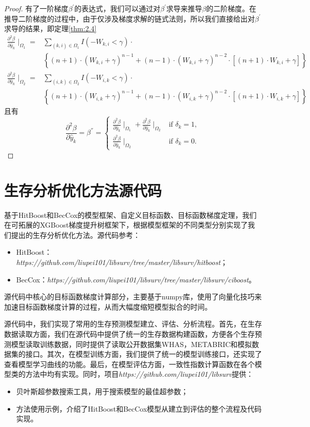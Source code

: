 \begin{proof}
有了一阶梯度$\beta^{'}$的表达式，我们可以通过对$\beta^{'}$求导来推导$\beta$的二阶梯度。在推导二阶梯度的过程中，由于仅涉及梯度求解的链式法则，所以我们直接给出对$\beta^{'}$求导的结果，即定理\ref{thm:2.4}\[
\begin{split}
\frac{\partial^2 \beta}{\partial \hat{y}_k} \mid_{\Omega_1} =& \sum\limits_{(k,i)\in \Omega_1} I(-W_{k,i}<\gamma)\cdot \\
  & \left\{(n+1)\cdot (W_{k,i}+\gamma)^{n-1} + (n-1)\cdot (W_{k,i}+\gamma)^{n-2}\cdot [(n+1)\cdot W_{k,i}+\gamma]\right\} \\
\frac{\partial^2 \beta}{\partial \hat{y}_k} \mid_{\Omega_2} =& \sum\limits_{(i,k)\in \Omega_2} I(-W_{i,k}<\gamma)\cdot \\
  & \left\{(n+1)\cdot (W_{i,k}+\gamma)^{n-1} + (n-1)\cdot (W_{i,k}+\gamma)^{n-2}\cdot [(n+1)\cdot W_{i,k}+\gamma]\right\}
\end{split}
\] 且有$$
\frac{\partial^2 \beta}{\partial \hat{y}_k}=\beta^{''}=
\begin{cases}
\frac{\partial^2 \beta}{\partial \hat{y}_k} \mid_{\Omega_1} + \frac{\partial^2 \beta}{\partial \hat{y}_k} \mid_{\Omega_2} & \text{if } \delta_k = 1,\\
\frac{\partial^2 \beta}{\partial \hat{y}_k} \mid_{\Omega_2} & \text{if } \delta_k = 0.
\end{cases}
$$
\end{proof}

\chapter{生存分析优化方法源代码}

基于HitBoost和BecCox的模型框架、自定义目标函数、目标函数梯度定理，我们在可拓展的XGBoost梯度提升树框架下，根据模型框架的不同类型分别实现了我们提出的生存分析优化方法。源代码参考：
\begin{itemize}
  \item HitBoost：\emph{https://github.com/liupei101/libsurv/tree/master/libsurv/hitboost}；
  \item BecCox：\emph{https://github.com/liupei101/libsurv/tree/master/libsurv/ciboost}。
\end{itemize}
源代码中核心的目标函数梯度计算部分，主要基于numpy库，使用了向量化技巧来加速目标函数梯度计算的过程，从而大幅度缩短模型拟合的时间。

源代码中，我们实现了常用的生存预测模型建立、评估、分析流程。首先，在生存数据读取方面，我们在源代码中提供了统一的生存数据构建函数，方便各个生存预测模型读取训练数据，同时提供了读取公开数据集WHAS，METABRIC和模拟数据集的接口。其次，在模型训练方面，我们提供了统一的模型训练接口，还实现了查看模型学习曲线的功能。最后，在模型评估方面，一致性指数计算函数在各个模型类的方法中均有实现。同时，项目\emph{https://github.com/liupei101/libsurv}提供：
\begin{itemize}
  \item 贝叶斯超参数搜索工具，用于搜索模型的最佳超参数；
  \item 方法使用示例，介绍了HitBoost和BecCox模型从建立到评估的整个流程及代码实现。
\end{itemize}